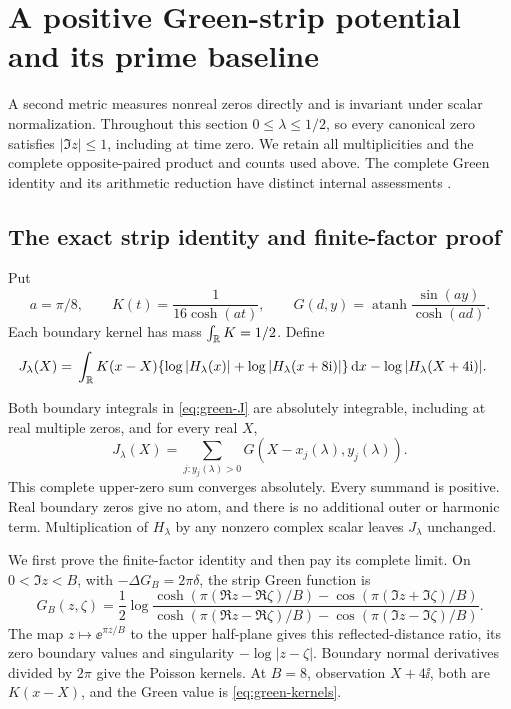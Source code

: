 \section{A positive Green-strip potential and its prime baseline}
\label{sec:green-strip}

A second metric measures nonreal zeros directly and is invariant under
scalar normalization. Throughout this section \(0\le\lambda\le1/2\),
so every canonical zero satisfies \(|\Im z|\le1\), including at time
zero. We retain all multiplicities and the complete opposite-paired
product and counts used above. The complete Green identity and its
arithmetic reduction have distinct internal assessments
\cite{GreenStripProof,LocalizedMetricsAssessment,MetricComparison,PrimeBaselineAssessment}.

\subsection{The exact strip identity and finite-factor proof}
Put
\begin{equation}\label{eq:green-kernels}
 a=\pi/8,\qquad K(t)=\frac1{16\cosh(at)},\qquad
 G(d,y)=\operatorname{atanh}\frac{\sin(ay)}{\cosh(ad)}.
\end{equation}
Each boundary kernel has mass \(\int_\mathbb R K=1/2\). Define
\begin{align}\label{eq:green-J}
 J_\lambda(X)={}&\int_\mathbb R K(x-X)
       \{\log|H_\lambda(x)|+\log|H_\lambda(x+8\mathrm i)|\}\,\mathrm d x
       -\log|H_\lambda(X+4\mathrm i)|.
\end{align}
\begin{theorem}\label{thm:green-identity}
Both boundary integrals in \eqref{eq:green-J} are absolutely integrable,
including at real multiple zeros, and for every real \(X\),
\begin{equation}\label{eq:green-identity}
 J_\lambda(X)=\sum_{j:y_j(\lambda)>0}
                  G(X-x_j(\lambda),y_j(\lambda)).
\end{equation}
This complete upper-zero sum converges absolutely. Every summand is
positive. Real boundary zeros give no atom, and there is no additional
outer or harmonic term. Multiplication of \(H_\lambda\) by any nonzero
complex scalar leaves \(J_\lambda\) unchanged.
\end{theorem}

We first prove the finite-factor identity and then pay its complete
limit. On \(0<\Im z<B\), with \(-\Delta G_B=2\pi\delta\), the strip
Green function is
\begin{equation}\label{eq:green-general}
 G_B(z,\zeta)=\frac12\log
 \frac{\cosh(\pi(\Re z-\Re\zeta)/B)-\cos(\pi(\Im z+\Im\zeta)/B)}
      {\cosh(\pi(\Re z-\Re\zeta)/B)-\cos(\pi(\Im z-\Im\zeta)/B)}.
\end{equation}
The map \(z\mapsto\ee^{\pi z/B}\) to the upper half-plane gives
this reflected-distance ratio, its zero boundary values and singularity
\(-\log|z-\zeta|\). Boundary normal derivatives divided by \(2\pi\)
give the Poisson kernels. At \(B=8\), observation \(X+4\ii\), both
are \(K(x-X)\), and the Green value is \eqref{eq:green-kernels}.


